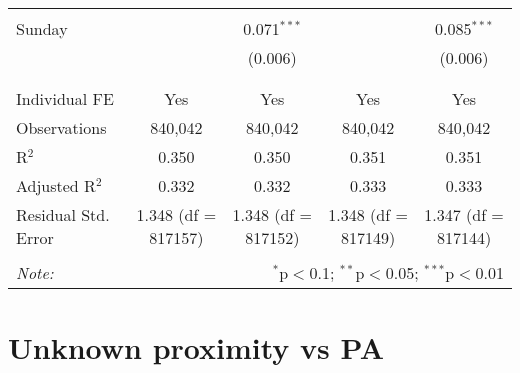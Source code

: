\documentclass[
]{article}
\begin{document}
\begin{table}[!htbp]
{\begin{tabular}{@{\extracolsep{5pt}}lcccc}
  & & & & \\ 
 Sunday &  & 0.071$^{***}$ &  & 0.085$^{***}$ \\ 
  &  & (0.006) &  & (0.006) \\ 
  & & & & \\ 
\hline \\[-1.8ex] 
Individual FE & Yes & Yes & Yes & Yes \\ 
Observations & 840,042 & 840,042 & 840,042 & 840,042 \\ 
R$^{2}$ & 0.350 & 0.350 & 0.351 & 0.351 \\ 
Adjusted R$^{2}$ & 0.332 & 0.332 & 0.333 & 0.333 \\ 
Residual Std. Error & 1.348 (df = 817157) & 1.348 (df = 817152) & 1.348 (df = 817149) & 1.347 (df = 817144) \\ 
\hline 
\hline \\[-1.8ex] 
\textit{Note:}  & \multicolumn{4}{r}{$^{*}$p$<$0.1; $^{**}$p$<$0.05; $^{***}$p$<$0.01} \\ 
\end{tabular}
} 
\end{table} 
\newpage
\section{Unknown proximity vs PA}
\end{document}
